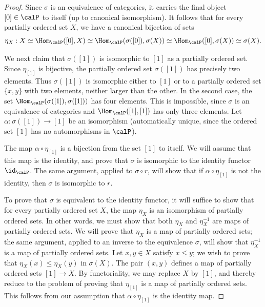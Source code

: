 \begin{proof}
Since $\sigma$ is an equivalence of categories, it carries the final object $[0] \in \calP$ to itself (up to canonical isomorphism). It follows that for every
partially ordered set $X$, we have a canonical bijection of sets
$$ \eta_{X}: X \simeq \Hom_{ \calP}( [0], X) \simeq
\Hom_{\calP}( \sigma([0]), \sigma(X) ) \simeq \Hom_{\calP}( [0], \sigma(X)) \simeq \sigma(X).$$

We next claim that $\sigma([1])$ is isomorphic to $[1]$ as a partially ordered set.
Since $\eta_{[1]}$ is bijective, the partially ordered set $\sigma([1])$ has precisely two elements.
Thus $\sigma([1])$ is isomorphic either to $[1]$ or to a partially ordered set $\{x,y\}$ with two elements, neither larger than the other. In the second case, the set $\Hom_{\calP}( \sigma([1]), \sigma([1]))$
has four elements. This is impossible, since $\sigma$ is an equivalence of categories and
$\Hom_{\calP}( [1], [1])$ has only three elements. Let $\alpha: \sigma([1]) \rightarrow [1]$
be an isomorphism (automatically unique, since the ordered set $[1]$ has no automorphisms in $\calP$). 

The map $\alpha \circ \eta_{[1]}$ is a bijection from the set $[1]$ to itself. We will assume that
this map is the identity, and prove that $\sigma$ is isomorphic to the identity functor $\id_{\calP}$.
The same argument, applied to $\sigma \circ r$, will show that if $\alpha \circ \eta_{[1]}$ is not the identity, then $\sigma$ is isomorphic to $r$.

To prove that $\sigma$ is equivalent to the identity functor, it will suffice to show that for every
partially ordered set $X$, the map $\eta_{X}$ is an isomorphism of partially ordered sets.
In other words, we must show that both $\eta_{X}$ and $\eta_{X}^{-1}$ are maps of partially ordered sets. We will prove that $\eta_{X}$ is a map of partially ordered sets; the same argument, applied to 
an inverse to the equivalence $\sigma$, will show that $\eta^{-1}_{X}$ is a map of partially ordered sets.
Let $x,y \in X$ satisfy $x \leq y$; we wish to prove that $\eta_{X}(x) \leq \eta_{X}(y)$ in $\sigma(X)$.
The pair $(x,y)$ defines a map of partially ordered sets $[1] \rightarrow X$. By functoriality, we
may replace $X$ by $[1]$, and thereby reduce to the problem of proving that $\eta_{[1]}$ is a map of partially ordered sets. This follows from our assumption that $\alpha \circ \eta_{[1]}$ is the identity map.
\end{proof}

